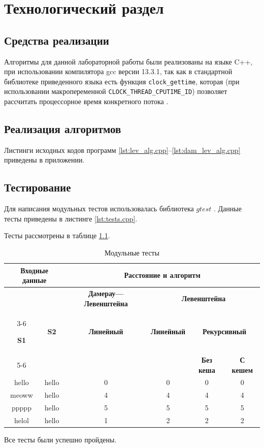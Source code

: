 \chapter{Технологический раздел}

\section{Средства реализации}
Алгоритмы для данной лабораторной работы были реализованы на языке C++, при использовании компилятора gcc версии 13.3.1, так как в стандартной библиотеке приведенного языка
есть функция \texttt{clock\_gettime}, которая (при использовании макропеременной \texttt{CLOCK\_THREAD\_CPUTIME\_ID}) позволяет рассчитать процессорное время конкретного потока \cite{cpp-time}.

\section{Реализация алгоритмов}
Листинги исходных кодов программ  \ref{lst:lev_alg.cpp}--\ref{lst:dam_lev_alg.cpp} приведены в приложении.

\section{Тестирование}
Для написания модульных тестов использовалась библиотека $gtest$ \cite{gtests}. Данные тесты приведены в листинге \ref{lst:tests.cpp}.

Тесты рассмотрены в таблице \ref{t:unit_tests}.

\begin{table}[!ht]
	\begin{center}
		\small
		\begin{threeparttable}
			\caption{Модульные тесты}
			\label{t:unit_tests}
			\begin{tabular}{|c|c|c|c|c|c|}
				\hline
				\multicolumn{2}{|c|}{\bfseries Входные данные}
				& \multicolumn{4}{c|}{\bfseries Расстояние и алгоритм} \\ 
				\hline 
				&
				& \multicolumn{1}{c|}{\bfseries Дамерау---Левенштейна} 
				& \multicolumn{3}{c|}{\bfseries Левенштейна} \\ \cline{3-6}
				
				\bfseries S1 & \bfseries S2 & \bfseries Линейный & \bfseries Линейный
				
				& \multicolumn{2}{c|}{\bfseries Рекурсивный} \\ \cline{5-6}
				& & & & \bfseries Без кеша & \bfseries С кешем \\
				\hline
				hello & hello & 0 & 0 & 0 & 0 \\
				\hline
				meoww & hello & 4 & 4 & 4 & 4 \\
				\hline
				ppppp & hello & 5 & 5 & 5 & 5 \\
				\hline
				helol & hello & 1 & 2 & 2 & 2 \\
				\hline
			\end{tabular}	
		\end{threeparttable}
	\end{center}
\end{table}

Все тесты были успешно пройдены.
